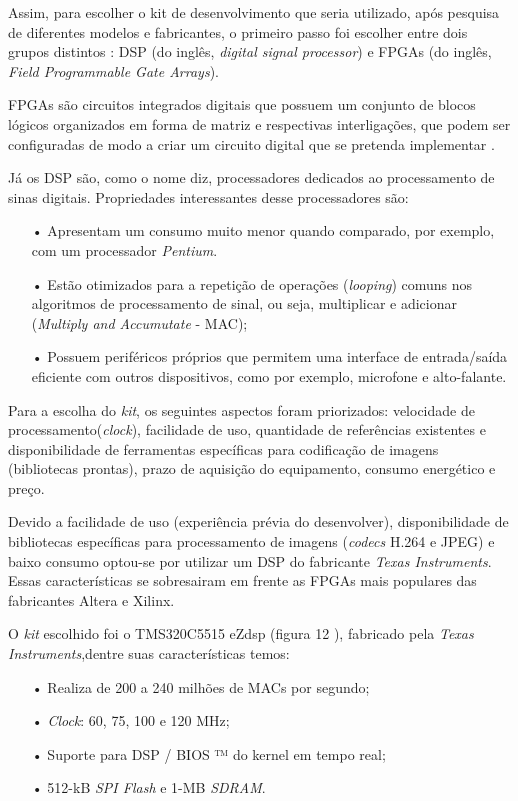 Assim, para escolher o kit de desenvolvimento que seria utilizado, após pesquisa
de diferentes modelos e fabricantes, o primeiro passo foi escolher entre dois grupos distintos
: DSP (do inglês, \textit{digital signal processor}) e FPGAs (do inglês,\textit{ Field Programmable Gate
Arrays}).

FPGAs são circuitos integrados digitais que possuem um conjunto de blocos lógicos
organizados em forma de matriz e respectivas interligações, que podem ser configuradas
de modo a criar um circuito digital que se pretenda implementar \cite{meixedo2008metodologias}.

Já os DSP são, como o nome diz, processadores dedicados ao processamento de sinas digitais. Propriedades interessantes desse processadores são:
\begin{itemize}
	\item[•] Apresentam um consumo muito menor quando comparado, por exemplo, com um
processador \textit{Pentium}.
	\item[•] Estão otimizados para a repetição de operações (\textit{looping}) comuns nos algoritmos de
processamento de sinal, ou seja, multiplicar e adicionar (\textit{Multiply and Accumutate} -
MAC);
\item[•] Possuem periféricos próprios que permitem uma interface de entrada/saída eficiente
com outros dispositivos, como por exemplo, microfone e alto-falante. 
\end{itemize}

Para a escolha do \textit{kit}, os seguintes aspectos foram priorizados: velocidade de processamento(\textit{clock}),
facilidade de uso, quantidade de referências existentes e disponibilidade
de ferramentas específicas para codificação de imagens (bibliotecas prontas), prazo de
aquisição do equipamento, consumo energético e preço.

Devido a facilidade de uso (experiência prévia do desenvolver), disponibilidade de bibliotecas específicas para processamento de imagens (\textit{codecs} H.264 e JPEG) e baixo consumo optou-se por utilizar um DSP do fabricante \textit{Texas Instruments}. Essas características se sobresairam em frente as FPGAs mais populares das fabricantes Altera e Xilinx.

O \textit{kit} escolhido foi o TMS320C5515 eZdsp (figura 12 ), fabricado pela \textit{Texas Instruments},dentre suas características temos:

\begin{itemize}
	\item[•] Realiza de 200 a 240 milhões de MACs  por segundo;
	\item[•] \textit{Clock}: 60, 75, 100 e 120 MHz;
	\item[•] Suporte para DSP / BIOS ™ do kernel em tempo real;
	\item[•] 512-kB \textit{SPI Flash} e 1-MB \textit{SDRAM}. 
\end{itemize}

